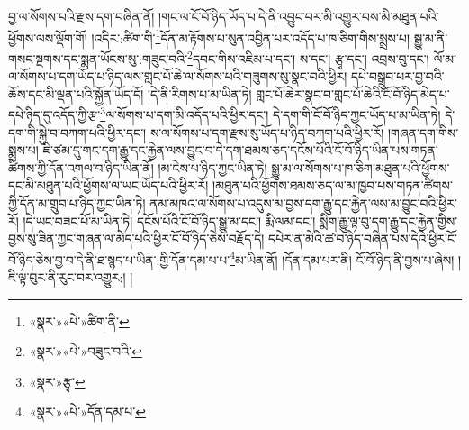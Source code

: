 བྱ་ལ་སོགས་པའི་རྫས་དག་བཞིན་ནོ། །གང་ལ་ངོ་བོ་ཉིད་ཡོད་པ་དེ་ནི་འབྱུང་བར་མི་འགྱུར་བས་མི་མཐུན་པའི་ཕྱོགས་ལས་ལྡོག་གོ། །འདིར་:ཚིག་གི་\footnote{«སྣར་»«པེ་»ཚིག་ནི་}དོན་མ་རྟོགས་པ་སུན་འབྱིན་པར་འདོད་པ་ཁ་ཅིག་གིས་སྨྲས་པ། སྒྱུ་མ་ནི་གསང་སྔགས་དང་སྨན་ཡོངས་སུ་:གཟུང་བའི་\footnote{«སྣར་»«པེ་»བཟུང་བའི་}དབང་གིས་འཇིམ་པ་དང་། ས་དང་། རྩྭ་དང་། འབྲས་བུ་དང་། ལོ་མ་ལ་སོགས་པ་དག་ཡོད་པ་ཉིད་ལས་གླང་པོ་ཆེ་ལ་སོགས་པའི་གཟུགས་སུ་སྣང་བའི་ཕྱིར། དཔེ་བསྒྲུབ་པར་བྱ་བའི་ཆོས་དང་མི་ལྡན་པའི་སྐྱོན་ཡོད་དོ། །དེ་ནི་རིགས་པ་མ་ཡིན་ཏེ། གླང་པོ་ཆེར་སྣང་བ་གླང་པོ་ཆེའི་ངོ་བོ་ཉིད་མེད་པ་དཔེ་ཉིད་དུ་འདོད་ཀྱི་རྩ་\footnote{«སྣར་»རྩྭ་}ལ་སོགས་པ་དག་མི་འདོད་པའི་ཕྱིར་དང་། དེ་དག་གི་ངོ་བོ་ཉིད་ཀྱང་ཡོད་པ་མ་ཡིན་ཏེ། དེ་དག་གི་སྐྱེ་བ་བཀག་པའི་ཕྱིར་དང་། ས་ལ་སོགས་པ་དག་རྫས་སུ་ཡོད་པ་ཉིད་བཀག་པའི་ཕྱིར་རོ། །གཞན་དག་གིས་སྨྲས་པ། ཇི་ཙམ་དུ་གང་དག་རྒྱུ་དང་རྐྱེན་ལས་བྱུང་བ་དེ་དག་ཐམས་ཅད་དངོས་པོའི་ངོ་བོ་ཉིད་ཡིན་པས་གཏན་ཚིགས་ཀྱི་དོན་འགལ་བ་ཉིད་ཡིན་ནོ། །མ་ངེས་པ་ཉིད་ཀྱང་ཡིན་ཏེ། སྒྱུ་མ་ལ་སོགས་པ་ཁ་ཅིག་མཐུན་པའི་ཕྱོགས་དང་མི་མཐུན་པའི་ཕྱོགས་ལ་ཡང་ཡོད་པའི་ཕྱིར་རོ། །མཐུན་པའི་ཕྱོགས་ཐམས་ཅད་ལ་མ་ཁྱབ་པས་གཏན་ཚིགས་ཀྱི་དོན་མ་གྲུབ་པ་ཉིད་ཀྱང་ཡིན་ཏེ། ནམ་མཁའ་ལ་སོགས་པ་འདུས་མ་བྱས་དག་རྒྱུ་དང་རྐྱེན་ལས་མ་བྱུང་བའི་ཕྱིར་རོ། །དེ་ཡང་བཟང་པོ་མ་ཡིན་ཏེ། དངོས་པོའི་ངོ་བོ་ཉིད་སྒྱུ་མ་དང་། རྨི་ལམ་དང་། སྨིག་རྒྱུ་ལྟ་བུ་དག་རྒྱུ་དང་རྐྱེན་གྱིས་བྱས་སུ་ཟིན་ཀྱང་གཞན་ལ་མེད་པའི་ཕྱིར་ངོ་བོ་ཉིད་ཅེས་བརྗོད་དེ། དཔེར་ན་མེའི་ཚ་བ་ཉིད་བཞིན་པས་དེའི་ཕྱིར་ངོ་བོ་ཉིད་ཅེས་བྱ་བ་དེ་ནི་ཐ་སྙད་པ་ཡིན་:གྱི་དོན་དམ་པ་པ་\footnote{«སྣར་»«པེ་»དོན་དམ་པ་}མ་ཡིན་ནོ། །དོན་དམ་པར་ནི། ངོ་བོ་ཉིད་ནི་བྱས་པ་ཞེས། །ཇི་ལྟ་བུར་ནི་རུང་བར་འགྱུར:། །
